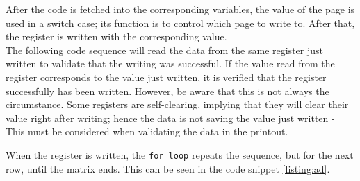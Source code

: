 \noindent After the code is fetched into the corresponding variables, the value of the page is used in a switch case; its function is to control which page to write to. After that, the register is written with the corresponding value.\\

\noindent The following code sequence will read the data from the same register just written to validate that the writing was successful. If the value read from the register corresponds to the value just written, it is verified that the register successfully has been written. However, be aware that this is not always the circumstance. Some registers are self-clearing, implying that they will clear their value right after writing; hence the data is not saving the value just written - This must be considered when validating the data in the printout.

When the register is written, the \texttt{for loop} repeats the sequence, but for the next row, until the matrix ends. This can be seen in the code snippet \ref{listing:ad}. 

